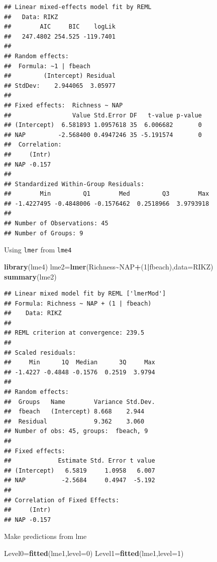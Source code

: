 \documentclass[
]{book}
\newenvironment{Shaded}{\begin{snugshade}}{\end{snugshade}}
\newcommand{\AttributeTok}[1]{\textcolor[rgb]{0.13,0.29,0.53}{#1}}
\newcommand{\DecValTok}[1]{\textcolor[rgb]{0.00,0.00,0.81}{#1}}
\newcommand{\FunctionTok}[1]{\textcolor[rgb]{0.13,0.29,0.53}{\textbf{#1}}}
\newcommand{\NormalTok}[1]{#1}
\newcommand{\OtherTok}[1]{\textcolor[rgb]{0.56,0.35,0.01}{#1}}
\newcommand{\SpecialCharTok}[1]{\textcolor[rgb]{0.81,0.36,0.00}{\textbf{#1}}}
\begin{document}
\begin{verbatim}
## Linear mixed-effects model fit by REML
##   Data: RIKZ 
##        AIC     BIC    logLik
##   247.4802 254.525 -119.7401
## 
## Random effects:
##  Formula: ~1 | fbeach
##         (Intercept) Residual
## StdDev:    2.944065  3.05977
## 
## Fixed effects:  Richness ~ NAP 
##                 Value Std.Error DF   t-value p-value
## (Intercept)  6.581893 1.0957618 35  6.006682       0
## NAP         -2.568400 0.4947246 35 -5.191574       0
##  Correlation: 
##     (Intr)
## NAP -0.157
## 
## Standardized Within-Group Residuals:
##        Min         Q1        Med         Q3        Max 
## -1.4227495 -0.4848006 -0.1576462  0.2518966  3.9793918 
## 
## Number of Observations: 45
## Number of Groups: 9
\end{verbatim}

Using \texttt{lmer} from \texttt{lme4}

\begin{Shaded}
\begin{Highlighting}[]
\FunctionTok{library}\NormalTok{(lme4)}
\NormalTok{lme2}\OtherTok{=}\FunctionTok{lmer}\NormalTok{(Richness}\SpecialCharTok{\textasciitilde{}}\NormalTok{NAP}\SpecialCharTok{+}\NormalTok{(}\DecValTok{1}\SpecialCharTok{|}\NormalTok{fbeach),}\AttributeTok{data=}\NormalTok{RIKZ)}
\FunctionTok{summary}\NormalTok{(lme2)}
\end{Highlighting}
\end{Shaded}

\begin{verbatim}
## Linear mixed model fit by REML ['lmerMod']
## Formula: Richness ~ NAP + (1 | fbeach)
##    Data: RIKZ
## 
## REML criterion at convergence: 239.5
## 
## Scaled residuals: 
##     Min      1Q  Median      3Q     Max 
## -1.4227 -0.4848 -0.1576  0.2519  3.9794 
## 
## Random effects:
##  Groups   Name        Variance Std.Dev.
##  fbeach   (Intercept) 8.668    2.944   
##  Residual             9.362    3.060   
## Number of obs: 45, groups:  fbeach, 9
## 
## Fixed effects:
##             Estimate Std. Error t value
## (Intercept)   6.5819     1.0958   6.007
## NAP          -2.5684     0.4947  -5.192
## 
## Correlation of Fixed Effects:
##     (Intr)
## NAP -0.157
\end{verbatim}

Make predictions from lme

\begin{Shaded}
\begin{Highlighting}[]
\NormalTok{Level0}\OtherTok{=}\FunctionTok{fitted}\NormalTok{(lme1,}\AttributeTok{level=}\DecValTok{0}\NormalTok{)}
\NormalTok{Level1}\OtherTok{=}\FunctionTok{fitted}\NormalTok{(lme1,}\AttributeTok{level=}\DecValTok{1}\NormalTok{)}
\end{Highlighting}
\end{Shaded}
\end{document}
